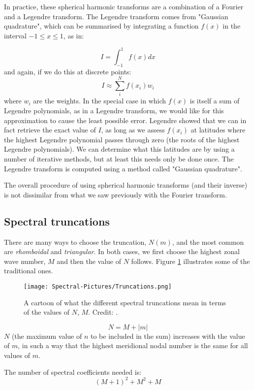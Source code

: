 In practice, these spherical harmonic transforms are a combination of a Fourier and a Legendre transform. The Legendre transform comes from "Gaussian quadrature", which can be summarised by integrating a function $f(x)$ in the interval $-1 \le x \le 1$, as in:

\begin{equation}
	I = \int_{-1}^{1}  f(x) dx
\end{equation}
and again, if we do this at discrete points:
\begin{equation}
	I \approx \sum_{i}^{N}  f(x_i) w_i
\end{equation}
where $w_i$ are the weights. In the special case in which $ f(x)$ is itself a sum of Legendre polynomials, as in a Legendre transform, we would like for this approximation to cause the least possible error. Legendre showed that we can in fact retrieve the exact value of $I$, as long as we assess $f(x_i)$ at latitudes where the highest Legendre polynomial passes through zero (the roots of the highest Legendre polynomials). We can determine what this latitudes are by using a number of iterative methods, but at least this needs only be done once. The Legendre transform is computed using a method called "Gaussian quadrature".

The overall procedure of using spherical harmonic transforms (and their inverse) is not dissimilar from what we saw previously with the Fourier transform.

\subsection{Spectral truncations}
There are many ways to choose the truncation, $N(m)$, and the most common are \emph{rhomboidal} and \emph{triangular}. In both cases, we first choose the highest zonal wave number, $M$ and then the value of $N$ follows. Figure \ref{fig:Truncations} illustrates some of the traditional ones.

\begin{figure}[h!]
	\begin{center}
		\texttt{[image: Spectral-Pictures/Truncations.png]}
	\end{center}
	\label{fig:Truncations}
	\caption{A cartoon of what the different spectral truncations mean in terms of the values of $N$, $M$. Credit: .}
\end{figure}

\begin{definition}
\begin{equation}
N = M + |m|
\end{equation}
 $N$ (the maximum value of $n$ to be included in the sum) increases with the value of $m$, in such a way that the highest meridional nodal number is the same for all values of $m$.
 
 The number of spectral coefficients needed is:
 \begin{equation}
 	(M+1)^2+M^2 + M
 \end{equation}
 
\end{definition}

